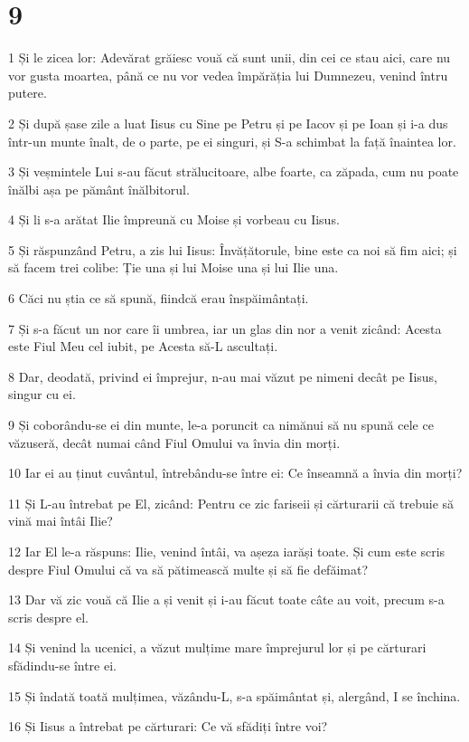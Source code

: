\chapter{9}

\par 1 Și le zicea lor: Adevărat grăiesc vouă că sunt unii, din cei ce stau aici, care nu vor gusta moartea, până ce nu vor vedea împărăția lui Dumnezeu, venind întru putere.
\par 2 Și după șase zile a luat Iisus cu Sine pe Petru și pe Iacov și pe Ioan și i-a dus într-un munte înalt, de o parte, pe ei singuri, și S-a schimbat la față înaintea lor.
\par 3 Și veșmintele Lui s-au făcut strălucitoare, albe foarte, ca zăpada, cum nu poate înălbi așa pe pământ înălbitorul.
\par 4 Și li s-a arătat Ilie împreună cu Moise și vorbeau cu Iisus.
\par 5 Și răspunzând Petru, a zis lui Iisus: Învățătorule, bine este ca noi să fim aici; și să facem trei colibe: Ție una și lui Moise una și lui Ilie una.
\par 6 Căci nu știa ce să spună, fiindcă erau înspăimântați.
\par 7 Și s-a făcut un nor care îi umbrea, iar un glas din nor a venit zicând: Acesta este Fiul Meu cel iubit, pe Acesta să-L ascultați.
\par 8 Dar, deodată, privind ei împrejur, n-au mai văzut pe nimeni decât pe Iisus, singur cu ei.
\par 9 Și coborându-se ei din munte, le-a poruncit ca nimănui să nu spună cele ce văzuseră, decât numai când Fiul Omului va învia din morți.
\par 10 Iar ei au ținut cuvântul, întrebându-se între ei: Ce înseamnă a învia din morți?
\par 11 Și L-au întrebat pe El, zicând: Pentru ce zic fariseii și cărturarii că trebuie să vină mai întâi Ilie?
\par 12 Iar El le-a răspuns: Ilie, venind întâi, va așeza iarăși toate. Și cum este scris despre Fiul Omului că va să pătimească multe și să fie defăimat?
\par 13 Dar vă zic vouă că Ilie a și venit și i-au făcut toate câte au voit, precum s-a scris despre el.
\par 14 Și venind la ucenici, a văzut mulțime mare împrejurul lor și pe cărturari sfădindu-se între ei.
\par 15 Și îndată toată mulțimea, văzându-L, s-a spăimântat și, alergând, I se închina.
\par 16 Și Iisus a întrebat pe cărturari: Ce vă sfădiți între voi?

